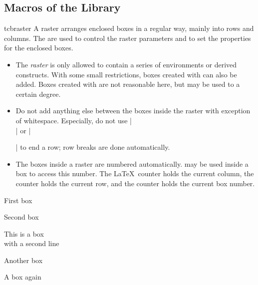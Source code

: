 
\bigskip
{\tcbuselistingtext}

\clearpage
\subsection{Macros of the Library}\label{subsec:raster_macros}

\begin{docEnvironment}[doc new and updated={2014-11-10}{2017-02-01}]{tcbraster}{}
A raster arranges enclosed boxes in a regular way, mainly into rows and
columns. The  are used to control the raster
parameters and to set the properties for the enclosed boxes.
\begin{itemize}
\item The \emph{raster} is only allowed to contain a series of
   environments or derived constructs.
  With some small restrictions, boxes created with  can also be added.
  Boxes created with  are not reasonable here, but may be
  used to a certain degree.
\item Do not add anything else between the boxes inside the raster with
  exception of white\-space. Especially, do not use |\\| or |\par| to end
  a row; row breaks are done automatically.
\item The boxes inside a raster are numbered automatically.
   may be used inside a box to access
  this number.
  The \LaTeX\ counter  holds the current column,
  the counter  holds the current row,
  and the counter  holds the current box number.
\end{itemize}

\enlargethispage*{1cm}

\begin{dispExample}
\begin{tcbraster}[raster columns=3, raster equal height,
  size=small,colframe=red!50!black,colback=red!10!white,colbacktitle=red!50!white,
  title={Box \# \thetcbrasternum}]
  \begin{tcolorbox}First box\end{tcolorbox}
  \begin{tcolorbox}Second box\end{tcolorbox}
  \begin{tcolorbox}This is a box\\with a second line\end{tcolorbox}
  \begin{tcolorbox}Another box\end{tcolorbox}
  \begin{tcolorbox}A box again\end{tcolorbox}
\end{tcbraster}
\end{dispExample}


\end{docEnvironment}
